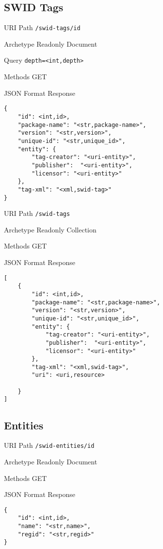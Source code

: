 \documentclass[10pt,a4paper]{scrartcl}
\begin{document}
\pagebreak
\subsection{SWID Tags}

\begin{mdframed}[style=def]
\begin{description*}
	\item[URI Path] \texttt{/swid-tags/{id}}
	\item[Archetype] Readonly Document
	\item[Query] \texttt{depth=<int,depth>}
	\item[Methods] GET
	\item[JSON Format Response] \hfill
\begin{lstlisting}
{
	"id": <int,id>,
	"package-name": "<str,package-name>",
	"version": "<str,version>",
	"unique-id": "<str,unique_id>",
	"entity": {
		"tag-creator": "<uri-entity>",
		"publisher":  "<uri-entity>",
		"licensor": "<uri-entity>"
	},
	"tag-xml": "<xml,swid-tag>"
}
\end{lstlisting}
\end{description*}
\end{mdframed}

\begin{mdframed}[style=def]
\begin{description*}
	\item[URI Path] \texttt{/swid-tags}
	\item[Archetype] Readonly Collection
	\item[Methods] GET
	\item[JSON Format Response] \hfill
\begin{lstlisting}
[
	{
		"id": <int,id>,
    	"package-name": "<str,package-name>",
    	"version": "<str,version>",
    	"unique-id": "<str,unique_id>",
    	"entity": {
    		"tag-creator": "<uri-entity>",
    		"publisher":  "<uri-entity>",
    		"licensor": "<uri-entity>"
    	},
    	"tag-xml": "<xml,swid-tag>",
    	"uri": <uri,resource>
    	
	}
]
\end{lstlisting}
\end{description*}
\end{mdframed}


\pagebreak
\subsection{Entities}

\begin{mdframed}[style=def]
\begin{description*}
	\item[URI Path] \texttt{/swid-entities/{id}}
	\item[Archetype] Readonly Document
	\item[Methods] GET
	\item[JSON Format Response] \hfill
\begin{lstlisting}
{
	"id": <int,id>,
	"name": "<str,name>",
	"regid": "<str,regid>"
}
\end{lstlisting}
\end{description*}
\end{mdframed}
\end{document}
